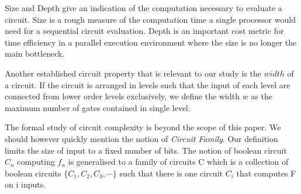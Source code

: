 \par
Size and Depth give an indication of the computation necessary to evaluate a circuit. Size is a rough measure of the computation time a single processor would need for a sequential circuit evaluation. Depth is an important cost metric for time efficiency in a parallel execution environment where the size is no longer the main bottleneck\cite{notes}. 
\par 
Another  established circuit property that is relevant to our study is the $width$ of a circuit\cite{clark}. If the circuit is arranged in levels such that the input of each level are connected from lower order levels exclusively, we define the width $w$ as the maximum number of gates contained in single level.
\par
The formal study of circuit complexity is beyond the scope of this paper. We should however quickly mention the notion of \textit{Circuit Family}. Our definition limits the size of input to a fixed number of bits. The notion of boolean circuit $C_n$ computing $f_n$  is generalised to a family of circuits C which is a collection of boolean circuits $\{C_1, C_2, C_3, \cdots\}$ such that there is one circuit $C_i$ that computes F on i inputs.
%
%
